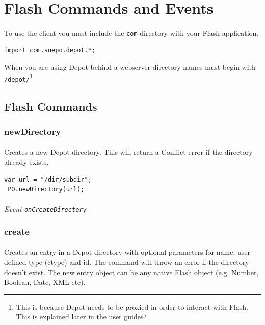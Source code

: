 \documentclass{report}
\begin{document}
\section{Flash Commands and Events}

\paragraph{}
To use the client you must include the
\texttt{com} directory with your Flash application.
\begin{Verbatim}[frame=single]
import com.snepo.depot.*;
\end{Verbatim}

When you are using Depot behind a webserver
directory names must begin with \texttt{/depot/}\footnote{This is
  because Depot needs to be proxied in order to interact with
  Flash. This is explained later in the user guide}


\subsection{Flash Commands}

\subsubsection{newDirectory}
\paragraph{}
Creates a new Depot directory. This will return a Conflict error
if the directory already exists.

\begin{Verbatim}[frame=single]
 var url = "/dir/subdir";
 PO.newDirectory(url);
\end{Verbatim}

\paragraph{}
\textit{Event \texttt{onCreateDirectory}}

\subsubsection{create}
\paragraph{}
Creates an entry in a Depot directory with optional parameters for name, user defined type (ctype) and id. The command will throw an
error if the directory doesn't exist. The new entry object can be any 
native Flash object (e.g. Number, Boolean, Date, XML etc).
\end{document}
